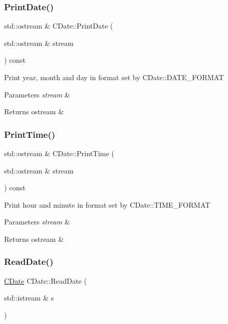 \subsubsection{\texorpdfstring{Print\+Date()}{PrintDate()}}
{\footnotesize\ttfamily std\+::ostream \& C\+Date\+::\+Print\+Date (\begin{DoxyParamCaption}\item[{std\+::ostream \&}]{stream }\end{DoxyParamCaption}) const}

Print year, month and day in format set by C\+Date\+::\+D\+A\+T\+E\+\_\+\+F\+O\+R\+M\+AT 
\begin{DoxyParams}{Parameters}
{\em stream} & \\
\hline
\end{DoxyParams}
\begin{DoxyReturn}{Returns}
ostream \& 
\end{DoxyReturn}
\mbox{\label{class_c_date_af1c7cb577d4136975d551323e48f5a26}} 
\subsubsection{\texorpdfstring{Print\+Time()}{PrintTime()}}
{\footnotesize\ttfamily std\+::ostream \& C\+Date\+::\+Print\+Time (\begin{DoxyParamCaption}\item[{std\+::ostream \&}]{stream }\end{DoxyParamCaption}) const}

Print hour and minute in format set by C\+Date\+::\+T\+I\+M\+E\+\_\+\+F\+O\+R\+M\+AT 
\begin{DoxyParams}{Parameters}
{\em stream} & \\
\hline
\end{DoxyParams}
\begin{DoxyReturn}{Returns}
ostream \& 
\end{DoxyReturn}
\mbox{\label{class_c_date_acecb85381be6fa61d1416b52b506d023}} 
\subsubsection{\texorpdfstring{Read\+Date()}{ReadDate()}}
{\footnotesize\ttfamily \mbox{\hyperlink{class_c_date}{C\+Date}} C\+Date\+::\+Read\+Date (\begin{DoxyParamCaption}\item[{std\+::istream \&}]{s }\end{DoxyParamCaption})\hspace{0.3cm}{\ttfamily [static]}}

